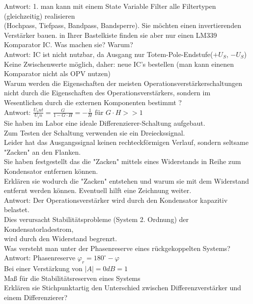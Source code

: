 \documentclass[A4]{scrreprt}
\begin{document}
  Antwort: 1. man kann mit einem State Variable Filter alle Filtertypen (gleichzeitig) realisieren\\
  \bigskip (Hochpass, Tiefpass, Bandpass, Bandsperre).
  \newpage
  Sie möchten einen invertierenden Verstärker bauen. in Ihrer Bastelkiste finden sie aber nur einen LM339 Komparator IC. Was machen sie? Warum?\\
  Antwort: IC ist nicht nutzbar, da Ausgang nur Totem-Pole-Endstufe($ +U_S$, $-U_S$)\\
  \bigskip Keine Zwischenwerte möglich, daher: neue IC's bestellen (man kann einenen Komparator nicht als OPV nutzen)\\
  Warum werden die Eigenschaften der meisten Operationsverstärkerschaltungen nicht durch die Eigenschaften des Operationsverstärkers, sondern im Wesentlichen durch die externen Komponenten bestimmt ?\\
  \bigskip Antwort: $\frac{U_out}{U_in} = \frac{G}{1-G\cdot H} = -\frac{1}{H}$ für $G\cdot H >> 1$\\
  Sie haben im Labor eine ideale Differenzierer-Schaltung aufgebaut.\\
  Zum Testen der Schaltung verwenden sie ein Dreieckssignal.\\
  Leider hat das Ausgangssignal keinen rechteckförmigen Verlauf, sondern seltsame "Zacken" an den Flanken.\\
  Sie haben festgestellt das die "Zacken" mittels eines Widerstands in Reihe zum Kondensator entfernen können.\\
  Erklären sie wodurch die "Zacken" entstehen und warum sie mit dem Widerstand entfernt werden können. Eventuell hilft eine Zeichnung weiter.\\
  Antwort: Der Operationsverstärker wird durch den Kondensator kapazitiv belastet.\\
  Dies verursacht Stabilitätsprobleme (System 2. Ordnung) der Kondensatorladestrom,\\
  \bigskip wird durch den Widerstand begrenzt.\\
  Was versteht man unter der Phasenreserve eines rückgekoppelten Systems?\\
  Antwort: Phasenreserve $ \varphi_r = 180^\circ - \varphi$\\
  Bei einer Verstärkung von $|A|=0dB=1$\\
  \bigskip Maß für die Stabilitätsreserven eines Systems\\
  Erklären sie Stichpunktartig den Unterschied zwischen Differenzverstärker und einem Differenzierer?\\
\end{document}

